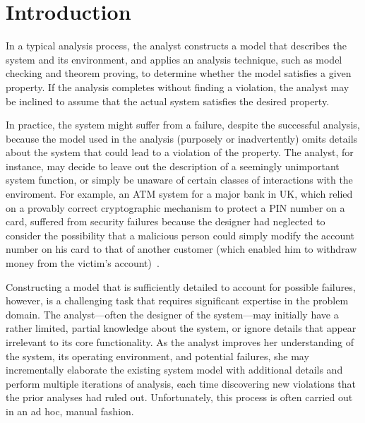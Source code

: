 
\section{Introduction}


In a typical analysis process, the analyst constructs a model that
describes the system and its environment, and applies an analysis
technique, such as model checking and theorem proving, to determine
whether the model satisfies a given property. If the analysis
completes without finding a violation, the analyst may be inclined to
assume that the actual system satisfies the desired property. 

In practice, the system might suffer from a failure, despite
the successful analysis, because the model used in the analysis
(purposely or inadvertently) omits details about the system that could
lead to a violation of the property. The analyst, for instance, may
decide to leave out the description of a seemingly unimportant system
function, or simply be unaware of certain classes of interactions with
the enviroment. For example, an ATM system for a major bank in UK,
which relied on a provably correct cryptographic mechanism to protect
a PIN number on a card, suffered from security failures because the
designer had neglected to consider the possibility that a malicious
person could simply modify the account number on his card to that
of another customer (which enabled him to withdraw money from the victim's
account)~\cite{anderson-needham}.

Constructing a model that is sufficiently detailed to account for
possible failures, however, is a challenging task that requires
significant expertise in the problem domain. The analyst---often the
designer of the system---may initially have a rather limited, partial
knowledge about the system, or ignore details that appear irrelevant
to its core functionality. As the analyst improves her understanding
of the system, its operating environment, and potential failures, she
may incrementally elaborate the existing system model with additional
details and perform multiple iterations of analysis,
each time discovering new violations that the prior analyses had ruled
out. Unfortunately, this process is often carried out in an ad hoc,
manual fashion.

